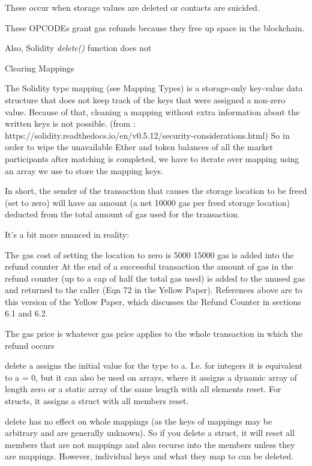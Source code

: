 These occur when storage values are deleted or contacts are suicided.

These OPCODEs grant gas refunds because they free up space in the blockchain.



Also, Solidity \textit{delete()} function does not 



Clearing Mappings

The Solidity type mapping (see Mapping Types) is a storage-only key-value data structure that does not keep track of the keys that were assigned a non-zero value. Because of that, cleaning a mapping without extra information about the written keys is not possible. (from : https://solidity.readthedocs.io/en/v0.5.12/security-considerations.html) So in order to wipe the unavailable Ether and token balances of all the market participants after matching is completed, we have to iterate over mapping using an array we use to store the mapping keys.





In short, the sender of the transaction that causes the storage location to be freed (set to zero) will have an amount (a net 10000 gas per freed storage location) deducted from the total amount of gas used for the transaction.

It's a bit more nuanced in reality:

The gas cost of setting the location to zero is 5000 %
15000 gas is added into the refund counter %
At the end of a successful transaction the amount of gas in the refund counter (up to a cap of half the total gas used) is added to the unused gas and returned to the caller (Eqn 72 in the Yellow Paper).
References above are to this version of the Yellow Paper, which discusses the Refund Counter in sections 6.1 and 6.2.

The gas price is whatever gas price applies to the whole transaction in which the refund occurs




delete a assigns the initial value for the type to a. I.e. for integers it is equivalent to a = 0, but it can also be used on arrays, where it assigns a dynamic array of length zero or a static array of the same length with all elements reset. For structs, it assigns a struct with all members reset.

delete has no effect on whole mappings (as the keys of mappings may be arbitrary and are generally unknown). So if you delete a struct, it will reset all members that are not mappings and also recurse into the members unless they are mappings. However, individual keys and what they map to can be deleted.












